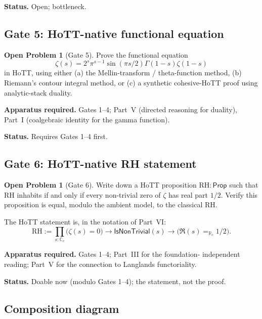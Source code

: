 \documentclass[12pt]{article}
\theoremstyle{definition}
\newtheorem{problem}[theorem]{Open Problem}
\theoremstyle{remark}
\newcommand{\R}{\mathbb{R}}
\newcommand{\C}{\mathbb{C}}
\newcommand{\Rc}{\R_{c}}
\newcommand{\Cc}{\C_{c}}
\newcommand{\Prop}{\mathsf{Prop}}
\begin{document}
\textbf{Status.} Open; bottleneck.

\subsection{Gate 5: HoTT-native functional equation}

\begin{problem}[Gate 5]\label{prob:gate5}
Prove the functional equation
\[
\zeta(s) = 2^{s} \pi^{s-1} \sin(\pi s/2) \Gamma(1-s) \zeta(1-s)
\]
in HoTT, using either (a) the Mellin-transform / theta-function method,
(b) Riemann's contour integral method, or (c) a synthetic cohesive-HoTT
proof using analytic-stack duality.
\end{problem}

\textbf{Apparatus required.} Gates 1--4; Part~V (directed reasoning for
duality), Part~I (coalgebraic identity for the gamma function).

\textbf{Status.} Requires Gates 1--4 first.

\subsection{Gate 6: HoTT-native RH statement}

\begin{problem}[Gate 6]\label{prob:gate6}
Write down a HoTT proposition $\mathrm{RH} : \Prop$ such that
$\mathrm{RH}$ inhabits if and only if every non-trivial zero of $\zeta$
has real part $1/2$. Verify this proposition is equal, modulo the
ambient model, to the classical RH\@.
\end{problem}

The HoTT statement is, in the notation of Part~VI:
\[
\mathrm{RH} := \prod_{s : \Cc} \bigl(\zeta(s) = 0\bigr) \to \mathsf{IsNonTrivial}(s) \to \bigl(\Re(s) =_{\Rc} 1/2\bigr).
\]

\textbf{Apparatus required.} Gates 1--4; Part~III for the foundation-
independent reading; Part~V for the connection to Langlands functoriality.

\textbf{Status.} Doable now (modulo Gates 1--4); the statement, not the
proof.

\subsection{Composition diagram}
\end{document}
